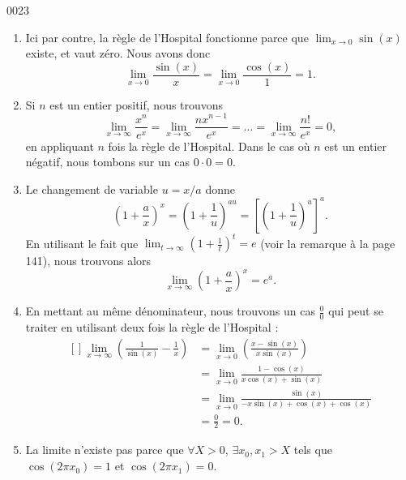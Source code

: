 \begin{corrige}{0023}
\begin{enumerate}
\item
Ici par contre, la règle de l'Hospital fonctionne parce que $\lim_{x\to0}\sin(x)$ existe, et vaut zéro. Nous avons donc
\begin{equation}
	\lim_{x\to 0}\frac{ \sin(x) }{ x }=\lim_{x\to 0}\frac{ \cos(x) }{ 1 }=1.
\end{equation}

\item
Si $n$ est un entier positif, nous trouvons
\begin{equation}
	\lim_{x\to\infty}\frac{ x^n }{  e^{x} }=\lim_{x\to\infty}\frac{ nx^{n-1} }{ e^x }=\ldots=\lim_{x\to \infty}\frac{ n! }{ e^x }=0,
\end{equation}
en appliquant $n$ fois la règle de l'Hospital. Dans le cas où $n$ est un entier négatif, nous tombons sur un cas $0\cdot0=0$.

\item
Le changement de variable $u=x/a$ donne
\begin{equation}
	\left( 1+\frac{ a }{ x } \right)^x=\left( 1+\frac{1}{ u } \right)^{au}=\left[ \left( 1+\frac{1}{ u } \right)^u \right]^a.
\end{equation}
En utilisant le fait que $\lim_{t\to\infty}\left( 1+\frac{1}{ t } \right)^t=e$ (voir la remarque à la page 141), nous trouvons alors
\begin{equation}
	\lim_{x\to\infty}\left( 1+\frac{ a }{ x } \right)^x=e^a.
\end{equation}

\item
En mettant au même dénominateur, nous trouvons un cas $\frac{ 0 }{ 0 }$ qui peut se traiter en utilisant deux fois la règle de l'Hospital :
\begin{equation}
	\begin{aligned}[]
	\lim_{x\to\infty}\left( \frac{1}{ \sin(x) }-\frac{1}{ x } \right)&=\lim_{x\to 0}\left( \frac{ x-\sin(x) }{ x\sin(x) } \right)\\
				&=\lim_{x\to 0}\frac{ 1-\cos(x) }{ x\cos(x)+\sin(x) }\\
				&=\lim_{x\to 0}\frac{ \sin(x) }{ -x\sin(x)+\cos(x)+\cos(x) }\\
				&=\frac{ 0 }{ 2 }=0.
	\end{aligned}
\end{equation}

\item
La limite n'existe pas parce que $\forall X>0$, $\exists x_0,x_1>X$ tels que $\cos(2\pi x_0)=1$ et $\cos(2\pi x_1)=0$.


\end{enumerate}
\end{corrige}
